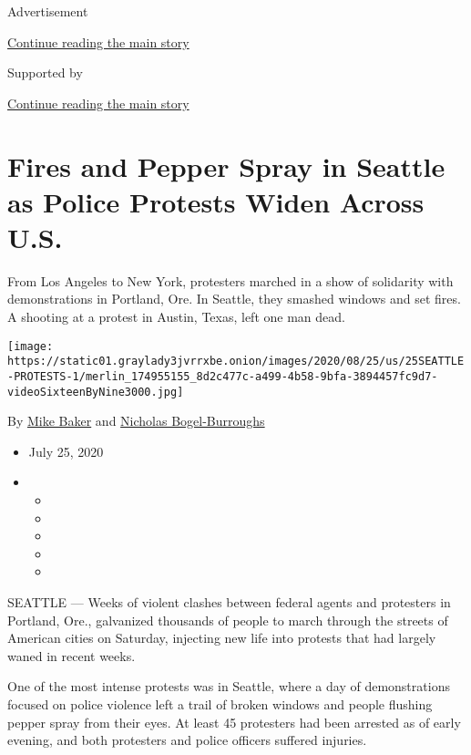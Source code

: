 Advertisement

\protect\hyperlink{after-top}{Continue reading the main story}

Supported by

\protect\hyperlink{after-sponsor}{Continue reading the main story}

\hypertarget{fires-and-pepper-spray-in-seattle-as-police-protests-widen-across-us}{%
\section{Fires and Pepper Spray in Seattle as Police Protests Widen
Across
U.S.}\label{fires-and-pepper-spray-in-seattle-as-police-protests-widen-across-us}}

From Los Angeles to New York, protesters marched in a show of solidarity
with demonstrations in Portland, Ore. In Seattle, they smashed windows
and set fires. A shooting at a protest in Austin, Texas, left one man
dead.

\texttt{[image: https://static01.graylady3jvrrxbe.onion/images/2020/08/25/us/25SEATTLE-PROTESTS-1/merlin\_174955155\_8d2c477c-a499-4b58-9bfa-3894457fc9d7-videoSixteenByNine3000.jpg]}

By \href{https://www.nytimes3xbfgragh.onion/by/mike-baker}{Mike Baker}
and
\href{https://www.nytimes3xbfgragh.onion/by/nicholas-bogel-burroughs}{Nicholas
Bogel-Burroughs}

\begin{itemize}
\item
  July 25, 2020
\item
  \begin{itemize}
  \item
  \item
  \item
  \item
  \item
  \end{itemize}
\end{itemize}

SEATTLE --- Weeks of violent clashes between federal agents and
protesters in Portland, Ore., galvanized thousands of people to march
through the streets of American cities on Saturday, injecting new life
into protests that had largely waned in recent weeks.

One of the most intense protests was in Seattle, where a day of
demonstrations focused on police violence left a trail of broken windows
and people flushing pepper spray from their eyes. At least 45 protesters
had been arrested as of early evening, and both protesters and police
officers suffered injuries.

